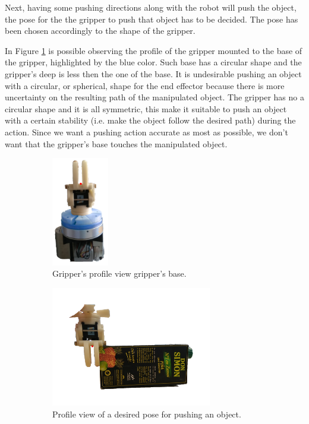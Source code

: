 Next, having some pushing directions along with the robot will push the object, the pose for the the gripper to push that object has to be decided. The pose has been chosen accordingly to the shape of the gripper.

In Figure \ref{fig:gripper_side}
is possible observing the profile of the gripper mounted to the base of the gripper, highlighted by the blue color. Such base has a circular shape and the gripper's deep is less then the one of the base. It is undesirable pushing an object with a circular, or spherical, shape for the end effector because there is more uncertainty on the resulting path of the manipulated object. The gripper has no a circular shape and it is all symmetric, this make it suitable to push an object with a certain stability (i.e. make the object follow the desired path) during the action. Since we want a pushing action accurate as most as possible, we don't want that the gripper's base touches the manipulated object. 
\begin{figure}[h]
\begin{subfigure}[t]{0.25\textwidth}
\centering
\includegraphics[width=2.5cm]{Img/set_up/gripper_side2.png}
\caption{Gripper's profile view gripper's base.}\label{fig:gripper_side}
\end{subfigure}
\begin{subfigure}[t]{0.7\textwidth}
\centering
\includegraphics[width=7cm]{Img/pushing/pushing1.png}
\caption{Profile view of a desired pose for pushing an object.}\label{fig:pushing_pose}
\end{subfigure}
\caption{}
\end{figure}
